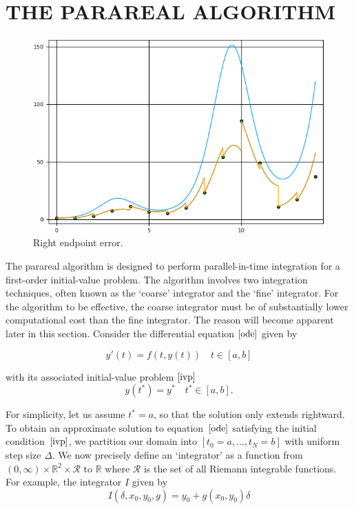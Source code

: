 \documentclass[12pt]{article}
\begin{document}
\section*{\normalsize THE PARAREAL ALGORITHM}

\begin{figure}
\centering
\includegraphics[scale=0.55]{error.png}
\caption{Right endpoint error.}
\label{errorIllustration}
\end{figure}

The parareal algorithm is designed to perform parallel-in-time integration for
a first-order initial-value problem.  The algorithm involves two integration
techniques, often known as the `coarse' integrator and the `fine'
integrator. For the algorithm to be effective, the coarse integrator must be of
substantially lower computational cost than the fine integrator. The reason
will become apparent later in this section.   Consider the differential
equation $\eqref{ode}$ given by

\begin{equation}\label{ode}
y'(t) = f(t,y(t)) \quad t \in [a,b]
\end{equation}

\noindent
with its associated initial-value problem $\eqref{ivp}$
\begin{equation}\label{ivp}
y(t^{*}) = y^{*} \quad t^{*} \in [a,b]\mathrm{.}
\end{equation}

\noindent For simplicity, let us assume $t^{*} = a$, so that the solution only
extends rightward.  To obtain an approximate solution to equation~$\eqref{ode}$
satisfying the initial condition~$\eqref{ivp}$, we partition our domain into
$[t_0=a,...,t_N=b]$ with uniform step size $\Delta$.
We now precisely define an `integrator' as a function from $(0,\infty) \times \mathbb{R}^{2} \times \mathscr{R}$ to $\mathbb{R}$ where $\mathscr{R}$ is the set of all Riemann integrable functions. For example, the integrator $I$ given by 
\begin{equation*}
I(\delta,x_0,y_0,g) = y_0 + g(x_0,y_0)\delta
\end{equation*}
\end{document}
